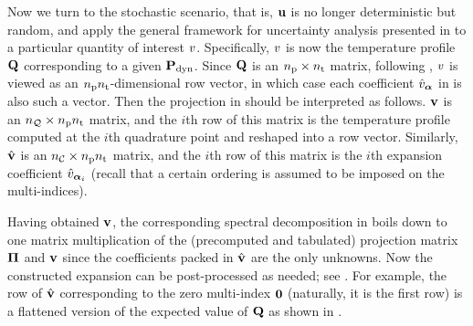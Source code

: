 Now we turn to the stochastic scenario, that is, $\mathbf{u}$ is no longer deterministic but random, and apply the general framework for uncertainty analysis presented in  to a particular quantity of interest $v$.
Specifically, $v$ is now the temperature profile $\mathbf{Q}$ corresponding to a given $\mathbf{P}_{\text{dyn}}$.
Since $\mathbf{Q}$ is an ${n_\text{p}} \times {n_\text{t}}$ matrix, following , $v$ is viewed as an ${n_\text{p}} {n_\text{t}}$-dimensional row vector, in which case each coefficient $\hat{v}_{\bm{\alpha}}$ in  is also such a vector.
Then the projection in  should be interpreted as follows.
$\mathbf{v}$ is an ${n_\mathcal{Q}} \times {n_\text{p}} {n_\text{t}}$ matrix, and the $i$th row of this matrix is the temperature profile computed at the $i$th quadrature point and reshaped into a row vector.
Similarly, $\hat{\mathbf{v}}$ is an ${n_\mathcal{C}} \times {n_\text{p}} {n_\text{t}}$ matrix, and the $i$th row of this matrix is the $i$th expansion coefficient $\hat{v}_{\bm{\alpha}_i}$ (recall that a certain ordering is assumed to be imposed on the multi-indices).

Having obtained $\mathbf{v}$, the corresponding spectral decomposition in  boils down to one matrix multiplication of the (precomputed and tabulated) projection matrix $\bm{\Pi}$ and $\mathbf{v}$ since the coefficients packed in $\hat{\mathbf{v}}$ are the only unknowns.
Now the constructed expansion can be post-processed as needed; see .
For example, the row of $\hat{\mathbf{v}}$ corresponding to the zero multi-index $\mathbf{0}$ (naturally, it is the first row) is a flattened version of the expected value of $\mathbf{Q}$ as shown in .
